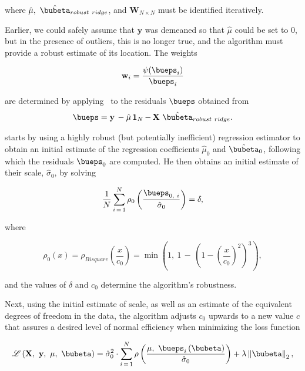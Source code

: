 \documentclass[graybox,envcountchap,sectrefs]{svmono}\usepackage[]{graphicx}\usepackage[]{xcolor}
\begin{document}
\begin{appendices}
where $\hat{\mu},\ \hat{\bubeta}_{robust\ ridge}$, and $\mathbf{W}_{N\times N}$
must be identified iteratively.

Earlier, we could safely assume that $\mathbf{y}$ was demeaned so
that $\hat{\mu}$ could be set to 0, but in the presence of outliers,
this is no longer true, and the algorithm must provide a robust estimate
of its location. The weights 

\begin{equation}
\mathbf{w}_{i}=\frac{\psi(\bueps_{i})}{\bueps_{i}}\label{eq:RobustRidgeWeights}
\end{equation}

are determined by applying \RobustWeightsDefinition\  to the residuals
$\bueps$ obtained from
\begin{equation}
\bueps=\mathbf{y}\,-\hat{\mu}\,\boldsymbol{1}_{N}\,\mathbf{-\,X}\ \hat{\bubeta}_{robust\ ridge}.\label{eq:RobustRidgeResiduals}
\end{equation}

\citet{Maronna2011} starts by using a highly robust (but potentially
inefficient) regression estimator to obtain an initial estimate of
the regression coefficients $\hat{\mu}_{0}$ and $\hat{\bubeta}_{0}$,
following which the residuals $\bueps_{0}$ are computed. He then
obtains an initial estimate of their scale, $\hat{\sigma}_{0}$, by
solving

\begin{equation}
\frac{1}{N}\sum_{i\thinspace=\,1}^{N}\rho_{0}\left(\frac{\bueps_{0,\ i}}{\hat{\sigma}_{0}}\right)=\delta,\label{eq:IntializeSigmaEstimate}
\end{equation}

where 

\begin{equation}
\rho_{0}(x)=\rho_{Bisquare}\left(\frac{x}{c_{0}}\right)=\min\left(1,\ 1\,-\,\left(1-\left(\frac{x}{c_{0}}\right)^{2}\right)^{3}\right),\label{eq:ScaledBisquareRhoc}
\end{equation}

and the values of $\delta$ and $c_{0}$ determine the algorithm's
robustness. 

Next, using the initial estimate of scale, as well as an estimate
of the equivalent degrees of freedom in the data, the algorithm adjusts
$c_{0}$ upwards to a new value $c$ that assures a desired level
of normal efficiency when minimizing the loss function

\begin{equation}
\mathscr{L}\left(\mathbf{X},\ \mathbf{y},\ \mu,\ \bubeta\right)=\hat{\sigma}_{0}^{2}\cdot\sum_{i\,=\,1}^{N}\rho\left(\frac{\mu,\ \bueps_{i}\left(\bubeta\right)}{\hat{\sigma}_{0}}\right)+\lambda\left\Vert \bubeta\right\Vert _{2},\label{eq:RobustRidgeLoss}
\end{equation}


\end{appendices}
\end{document}
